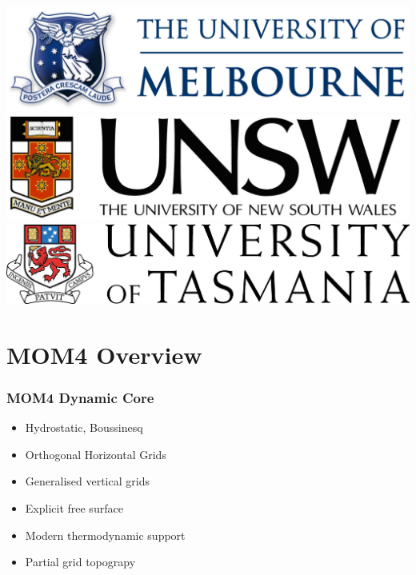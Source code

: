 \documentclass[red]{beamer}
\begin{document}
\begin{frame}
\begin{textblock*}{\textwidth}
        \includegraphics[height=0.061\textheight]{umelb_logo.png}
        \hspace{0.02\textwidth}
        \includegraphics[height=0.061\textheight]{unsw_logo.jpg}
        \hspace{0.02\textwidth}
        \includegraphics[height=0.061\textheight]{utas_logo.jpg}
    \end{textblock*}
\end{frame}

\section[Overview]{MOM4 Overview}

\begin{frame}
    \frametitle{MOM4 Dynamic Core}
    
    \begin{itemize}
        \item Hydrostatic, Boussinesq
        \item Orthogonal Horizontal Grids
        \item Generalised vertical grids
		\item Explicit free surface
		\item Modern thermodynamic support
        \item Partial grid topograpy
    \end{itemize}
\end{frame}
\end{document}
